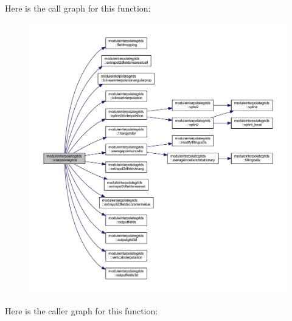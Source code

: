 Here is the call graph for this function\+:\nopagebreak
\begin{figure}[H]
\begin{center}
\leavevmode
\includegraphics[width=350pt]{namespacemoduleinterpolategrids_a138eb9151410639c12869a99628fc486_cgraph}
\end{center}
\end{figure}
Here is the caller graph for this function\+:\nopagebreak
